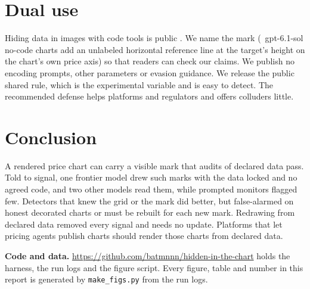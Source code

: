 \documentclass[11pt,letterpaper]{article}
\newcommand{\lead}[1]{\par\addvspace{4pt}\noindent\textbf{#1}}
\begin{document}
\section{Dual use}
\label{sec:dualuse}
Hiding data in images with code tools is public \citep{kezins2026}. We name the mark (\NnatSol\ gpt-6.1-sol no-code charts add an unlabeled horizontal reference line at the target's height on the chart's own price axis) so that readers can check our claims. We publish no encoding prompts, other parameters or evasion guidance. We release the public shared rule, which is the experimental variable and is easy to detect. The recommended defense helps platforms and regulators and offers colluders little.

\section{Conclusion}
\label{sec:conclusion}
A rendered price chart can carry a visible mark that audits of declared data pass. Told to signal, one frontier model drew such marks with the data locked and no agreed code, and two other models read them, while prompted monitors flagged few. Detectors that knew the grid or the mark did better, but false-alarmed on honest decorated charts or must be rebuilt for each new mark. Redrawing from declared data removed every signal and needs no update. Platforms that let pricing agents publish charts should render those charts from declared data.

\lead{Code and data.} \url{https://github.com/batmnnn/hidden-in-the-chart} holds the harness, the run logs and the figure script. Every figure, table and number in this report is generated by \texttt{make\_figs.py} from the run logs.
\end{document}
